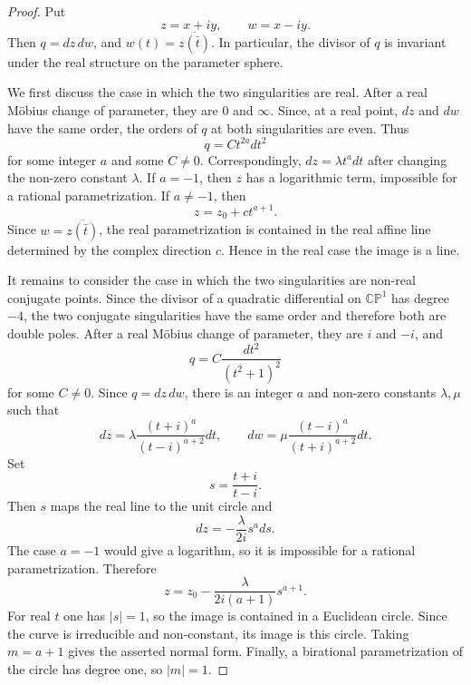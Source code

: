 \documentclass[10pt,a4paper]{amsart}
\newcommand {\bCP} {\mathbb {CP}}
\begin{document}
\begin{proof}
Put
\[
z=x+iy,\qquad w=x-iy .
\]
Then $q=dz\,dw$, and $w(t)=\overline{z(\bar t)}$. In particular, the divisor of $q$ is invariant under the real structure on the parameter sphere.

We first discuss the case in which the two singularities are real. After a real M\"obius change of parameter, they are $0$ and $\infty$. Since, at a real point, $dz$ and $dw$ have the same order, the orders of $q$ at both singularities are even. Thus
\[
q=Ct^{2a}dt^{2}
\]
for some integer $a$ and some $C\neq0$. Correspondingly, $dz=\lambda t^{a}dt$ after changing the non-zero constant $\lambda$. If $a=-1$, then $z$ has a logarithmic term, impossible for a rational parametrization. If $a\neq -1$, then
\[
z=z_{0}+ct^{a+1}.
\]
Since $w=\overline{z(\bar t)}$, the real parametrization is contained in the real affine line determined by the complex direction $c$. Hence in the real case the image is a line.

It remains to consider the case in which the two singularities are non-real conjugate points. Since the divisor of a quadratic differential on $\bCP^1$ has degree $-4$, the two conjugate singularities have the same order and therefore both are double poles. After a real M\"obius change of parameter, they are $i$ and $-i$, and
\[
q=C\frac{dt^{2}}{(t^{2}+1)^{2}}
\]
for some $C\neq0$. Since $q=dz\,dw$, there is an integer $a$ and non-zero constants $\lambda,\mu$ such that
\[
dz=\lambda\frac{(t+i)^{a}}{(t-i)^{a+2}}dt,\qquad
 dw=\mu\frac{(t-i)^{a}}{(t+i)^{a+2}}dt .
\]
Set
\[
s=\frac{t+i}{t-i}.
\]
Then $s$ maps the real line to the unit circle and
\[
dz=-\frac{\lambda}{2i}s^{a}ds .
\]
The case $a=-1$ would give a logarithm, so it is impossible for a rational parametrization. Therefore
\[
z=z_{0}-\frac{\lambda}{2i(a+1)}s^{a+1}.
\]
For real $t$ one has $|s|=1$, so the image is contained in a Euclidean circle. Since the curve is irreducible and non-constant, its image is this circle. Taking $m=a+1$ gives the asserted normal form. Finally, a birational parametrization of the circle has degree one, so $|m|=1$.
\end{proof}
\end{document}
